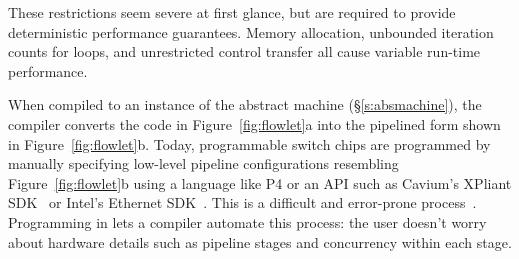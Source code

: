These restrictions seem severe at first glance, but are required to provide
deterministic performance guarantees. Memory allocation, unbounded iteration
counts for loops, and unrestricted control transfer all cause variable run-time
performance.

When compiled to an instance of the \absmachine abstract machine (\S\ref{s:absmachine}), the
\pktlanguage compiler converts the code in Figure~\ref{fig:flowlet}a into the
pipelined form shown in Figure~\ref{fig:flowlet}b. Today, programmable switch
chips are programmed by manually specifying low-level pipeline configurations
resembling Figure~\ref{fig:flowlet}b using a language like P4 or an API such as
Cavium's XPliant SDK~\cite{xpliant_sdk} or Intel's Ethernet
SDK~\cite{intel_sdk}. This is a difficult and error-prone
process~\cite{p4-semantics}.  Programming in \pktlanguage lets a compiler
automate this process: the user doesn't worry about hardware details such as
pipeline stages and concurrency within each stage.
